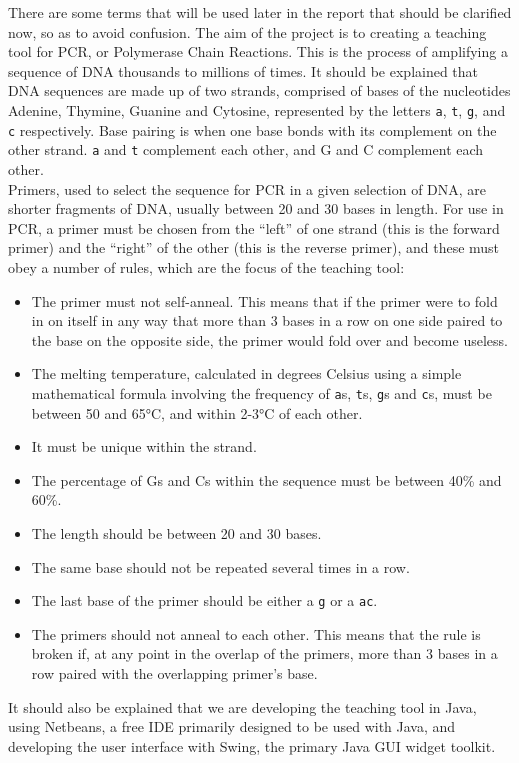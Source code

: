 There are some terms that will be used later in the report that should be clarified now, so as to avoid confusion. The aim of the project is to creating a teaching tool for PCR, or Polymerase Chain Reactions. This is the process of amplifying a sequence of DNA thousands to millions of times. It should be explained that DNA sequences are made up of two strands, comprised of bases of the nucleotides Adenine, Thymine, Guanine and Cytosine, represented by the letters \verb£a£, \verb£t£, \verb£g£, and \verb£c£ respectively. Base pairing is when one base bonds with its complement on the other strand. \verb£a£ and \verb£t£ complement each other, and G and C complement each other.\\
Primers, used to select the sequence for PCR in a given selection of DNA, are shorter fragments of DNA, usually between 20 and 30 bases in length. For use in PCR, a primer must be chosen from the “left” of one strand (this is the forward primer) and the “right” of the other (this is the reverse primer), and these must obey a number of rules, which are the focus of the teaching tool:
\begin{itemize}
\item The primer must not self-anneal. This means that if the primer were to fold in on itself in any way that more than 3 bases in a row on one side paired to the base on the opposite side, the primer would fold over and become useless.
\item The melting temperature, calculated in degrees Celsius using a simple mathematical formula involving the frequency of \verb£a£s, \verb£t£s, \verb£g£s and \verb£c£s, must be between 50 and 65°C, and within 2-3°C of each other.
\item It must be unique within the strand.
\item The percentage of Gs and Cs within the sequence must be between 40\% and 60\%.
\item The length should be between 20 and 30 bases.
\item The same base should not be repeated several times in a row.
\item The last base of the primer should be either a \verb£g£ or a \verb£ac£.
\item The primers should not anneal to each other. This means that the rule is broken if, at any point in the overlap of the primers, more than 3 bases in a row paired with the overlapping primer’s base.
\end{itemize}
It should also be explained that we are developing the teaching tool in Java, using Netbeans, a free IDE primarily designed to be used with Java, and developing the user interface with Swing, the primary Java GUI widget toolkit.

